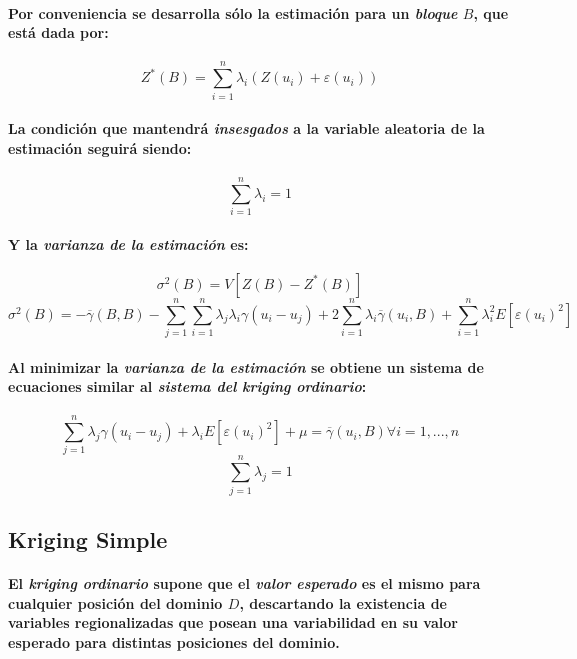 \paragraph{
Por conveniencia se desarrolla sólo la estimación para un \emph{bloque} $B$, que está dada por:
}
\begin{equation}
Z^*(B) = \sum_{i=1}^n \lambda_i (Z(u_i) + \varepsilon(u_i))
\end{equation}
\paragraph{
La condición que mantendrá \emph{insesgados} a la variable aleatoria de la estimación seguirá siendo:
}
\begin{equation}
\sum_{i=1}^n \lambda_i = 1
\end{equation}
\paragraph{
Y la \emph{varianza de la estimación} es:
}
\begin{equation}
\sigma^2(B) = V[Z(B)-Z^*(B)]
\end{equation}
\begin{equation}
\sigma^2(B) = -\overline{\gamma}(B,B) - \sum_{j=1}^n \sum_{i=1}^n \lambda_j \lambda_i \gamma(u_i - u_j) + 2 \sum_{i=1}^n \lambda_i \overline{\gamma}(u_i,B) + \sum_{i=1}^n \lambda_i^2 E[\varepsilon(u_i)^2]
\end{equation}
\paragraph{
Al minimizar la \emph{varianza de la estimación} se obtiene un sistema de ecuaciones similar al \emph{sistema del kriging ordinario}:
}
\begin{equation}
\sum_{j=1}^n \lambda_j \gamma(u_i - u_j) + \lambda_i E[\varepsilon(u_i)^2] + \mu = \overline{\gamma}(u_i,B) \forall i = 1,...,n
\end{equation}
\begin{equation}
\sum_{j=1}^n \lambda_j = 1
\end{equation}


\subsection{Kriging Simple}
\paragraph{
El \emph{kriging ordinario} supone que el \emph{valor esperado} es el mismo para cualquier posición del dominio $D$, descartando la existencia de variables regionalizadas que posean una variabilidad en su valor esperado para distintas posiciones del dominio.
}
